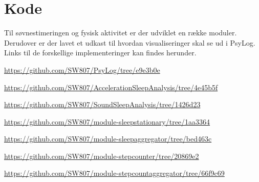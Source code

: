 \chapter{Kode}\label{app:kode}
Til søvnestimeringen og fysisk aktivitet er der udviklet en række moduler.
Derudover er der lavet et udkast til hvordan visualiseringer skal se ud i PsyLog.
Links til de forskellige implementeringer kan findes herunder.

\begin{description}[style=nextline]
	\item[PsyLog - Viewbranch] \url{https://github.com/SW807/PsyLog/tree/e9e3b0e}
	\item[AccelerationSleepAnalysis] \url{https://github.com/SW807/AccelerationSleepAnalysis/tree/4e45b5f}
	\item[SoundSleepAnalysis] \url{https://github.com/SW807/SoundSleepAnalysis/tree/1426d23}
	\item[module-sleepstationary] \url{https://github.com/SW807/module-sleepstationary/tree/1aa3364}
	\item[module-sleepaggregator] \url{https://github.com/SW807/module-sleepaggregator/tree/bed463c}
	\item[module-stepcounter] \url{https://github.com/SW807/module-stepcounter/tree/20869e2}
	\item[module-stepcountaggregator] \url{https://github.com/SW807/module-stepcountaggregator/tree/66f9c69}
\end{description}